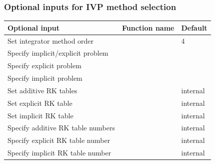 \documentclass[letterpaper,10pt,english]{sphinxmanual}
\begin{document}
\subsubsection{Optional inputs for IVP method selection}
\label{c_interface/User_callable:optional-inputs-for-ivp-method-selection}\label{c_interface/User_callable:cinterface-arkodemethodinputtable}
\begin{tabulary}{\linewidth}{|L|L|L|}
\hline
\textbf{
Optional input
} & \textbf{
Function name
} & \textbf{
Default
}\\\hline

Set integrator method order
 & 
{\hyperref[c_interface/User_callable:ARKodeSetOrder]{}}
 & 
4
\\\hline

Specify implicit/explicit problem
 & 
{\hyperref[c_interface/User_callable:ARKodeSetImEx]{}}
 & 
\\\hline

Specify explicit problem
 & 
{\hyperref[c_interface/User_callable:ARKodeSetExplicit]{}}
 & 
\\\hline

Specify implicit problem
 & 
{\hyperref[c_interface/User_callable:ARKodeSetImplicit]{}}
 & 
\\\hline

Set additive RK tables
 & 
{\hyperref[c_interface/User_callable:ARKodeSetARKTables]{}}
 & 
internal
\\\hline

Set explicit RK table
 & 
{\hyperref[c_interface/User_callable:ARKodeSetERKTable]{}}
 & 
internal
\\\hline

Set implicit RK table
 & 
{\hyperref[c_interface/User_callable:ARKodeSetIRKTable]{}}
 & 
internal
\\\hline

Specify additive RK table numbers
 & 
{\hyperref[c_interface/User_callable:ARKodeSetARKTableNum]{}}
 & 
internal
\\\hline

Specify explicit RK table number
 & 
{\hyperref[c_interface/User_callable:ARKodeSetERKTableNum]{}}
 & 
internal
\\\hline

Specify implicit RK table number
 & 
{\hyperref[c_interface/User_callable:ARKodeSetIRKTableNum]{}}
 & 
internal
\\\hline
\end{tabulary}
\end{document}
